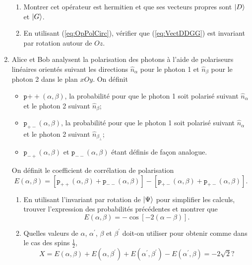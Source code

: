 \begin{enumerate}
\begin{enumerate}
\item Montrer cet opérateur est hermitien et que ses vecteurs propres sont
$\vert D\rangle$ et $\vert G\rangle$.

\item En utilisant (\ref{eq:OpPolCirc}), vérifier que (\ref{eq:VectDDGG}) est
invariant par rotation autour de $Oz$.
\end{enumerate}

\item Alice et Bob analysent la polarisation des photons à l'aide de
polariseurs linéaires orientés suivant les directions $\hat{n}_{\alpha}$ pour
le photon 1 et $\hat{n}_{\beta}$ pour le photon 2 dans le plan $xOy$. On définit

\begin{itemize}
\item $\texttt{p}{++}(\alpha,\beta)$, la probabilité pour que le photon 1 soit
polarisé suivant $\hat{n}_{\alpha}$ et le photon 2 suivant $\hat{n}_{\beta}$;

\item $\texttt{p}_{+-}(\alpha,\beta)$, la probabilité pour que le photon 1 soit
polarisé suivant $\hat{n}_{\alpha}$ et le photon 2 suivant
$\hat{n}_{\beta_{\bot}}$;

\item $\texttt{p}_{-+}(\alpha,\beta)$ et $\texttt{p}_{--}(\alpha,\beta)$ étant
définis de façon analogue.
\end{itemize}

On définit le coefficient de corrélation de polarisation%
\begin{equation}
E(\alpha,\beta)=[\texttt{p}_{++}(\alpha,\beta)+\texttt{p}_{--}(\alpha,\beta)]-[
\texttt{p}_{+-} (\alpha,\beta) +\texttt{p}_{+-}(\alpha,\beta)].
\end{equation}


\begin{enumerate}
\item En utilisant l'invariant par rotation de $\vert\Psi\rangle$ pour simplifier
les calculs, trouver l'expression des probabilités précédentes et montrer que%
\begin{equation}
E(\alpha,\beta)=-\cos[-2(\alpha-\beta)].
\end{equation}

\item Quelles valeurs de $\alpha$, $\alpha^{\prime}$, $\beta$ et
$\beta^{\prime}$ doit-on utiliser pour obtenir comme dans le cas des spins
$\frac{1}{2}$,
\begin{equation}
X=E(\alpha,\beta)+E(\alpha,\beta^{\prime})+E(\alpha^{\prime},\beta^{\prime
})-E(\alpha^{\prime},\beta)=-2\sqrt{2}?
\end{equation}


\end{enumerate}
\end{enumerate}
